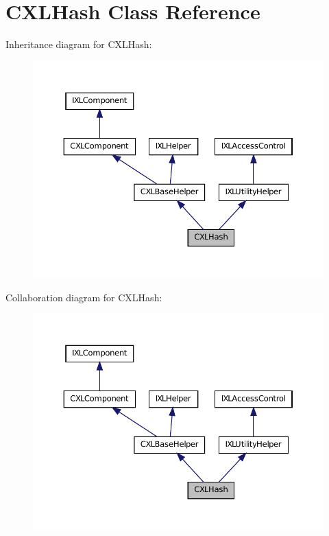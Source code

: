 \hypertarget{classCXLHash}{
\section{CXLHash Class Reference}
\label{classCXLHash}
}


Inheritance diagram for CXLHash:\nopagebreak
\begin{figure}[H]
\begin{center}
\leavevmode
\includegraphics[width=370pt]{classCXLHash__inherit__graph}
\end{center}
\end{figure}


Collaboration diagram for CXLHash:\nopagebreak
\begin{figure}[H]
\begin{center}
\leavevmode
\includegraphics[width=370pt]{classCXLHash__coll__graph}
\end{center}
\end{figure}

